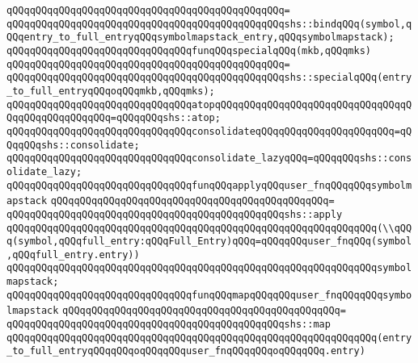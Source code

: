 \verb|qQQqqQQqqQQqqQQqqQQqqQQqqQQqqQQqqQQqqQQqqQQqqQQq=|\newline
\verb|qQQqqQQqqQQqqQQqqQQqqQQqqQQqqQQqqQQqqQQqqQQqqQQqshs::bindqQQq(symbol,qQQqentry_to_full_entryqQQqsymbolmapstack_entry,qQQqsymbolmapstack);|\newline
\newline
\verb|qQQqqQQqqQQqqQQqqQQqqQQqqQQqqQQqfunqQQqspecialqQQq(mkb,qQQqmks)|\newline
\verb|qQQqqQQqqQQqqQQqqQQqqQQqqQQqqQQqqQQqqQQqqQQqqQQq=|\newline
\verb|qQQqqQQqqQQqqQQqqQQqqQQqqQQqqQQqqQQqqQQqqQQqqQQqshs::specialqQQq(entry_to_full_entryqQQqoqQQqmkb,qQQqmks);|\newline
\newline
\verb|qQQqqQQqqQQqqQQqqQQqqQQqqQQqqQQqatopqQQqqQQqqQQqqQQqqQQqqQQqqQQqqQQqqQQqqQQqqQQqqQQqqQQq=qQQqqQQqshs::atop;|\newline
\verb|qQQqqQQqqQQqqQQqqQQqqQQqqQQqqQQqconsolidateqQQqqQQqqQQqqQQqqQQqqQQq=qQQqqQQqshs::consolidate;|\newline
\verb|qQQqqQQqqQQqqQQqqQQqqQQqqQQqqQQqconsolidate_lazyqQQq=qQQqqQQqshs::consolidate_lazy;|\newline
\newline
\verb|qQQqqQQqqQQqqQQqqQQqqQQqqQQqqQQqfunqQQqapplyqQQquser_fnqQQqqQQqsymbolmapstack|\newline
\verb|qQQqqQQqqQQqqQQqqQQqqQQqqQQqqQQqqQQqqQQqqQQqqQQq=|\newline
\verb|qQQqqQQqqQQqqQQqqQQqqQQqqQQqqQQqqQQqqQQqqQQqqQQqshs::apply|\newline
\verb|qQQqqQQqqQQqqQQqqQQqqQQqqQQqqQQqqQQqqQQqqQQqqQQqqQQqqQQqqQQqqQQq(\\qQQq(symbol,qQQqfull_entry:qQQqFull_Entry)qQQq=qQQqqQQquser_fnqQQq(symbol,qQQqfull_entry.entry))|\newline
\verb|qQQqqQQqqQQqqQQqqQQqqQQqqQQqqQQqqQQqqQQqqQQqqQQqqQQqqQQqqQQqqQQqsymbolmapstack;|\newline
\newline
\verb|qQQqqQQqqQQqqQQqqQQqqQQqqQQqqQQqfunqQQqmapqQQqqQQquser_fnqQQqqQQqsymbolmapstack|\newline
\verb|qQQqqQQqqQQqqQQqqQQqqQQqqQQqqQQqqQQqqQQqqQQqqQQq=|\newline
\verb|qQQqqQQqqQQqqQQqqQQqqQQqqQQqqQQqqQQqqQQqqQQqqQQqshs::map|\newline
\verb|qQQqqQQqqQQqqQQqqQQqqQQqqQQqqQQqqQQqqQQqqQQqqQQqqQQqqQQqqQQqqQQq(entry_to_full_entryqQQqqQQqoqQQqqQQquser_fnqQQqqQQqoqQQqqQQq.entry)|\newline
